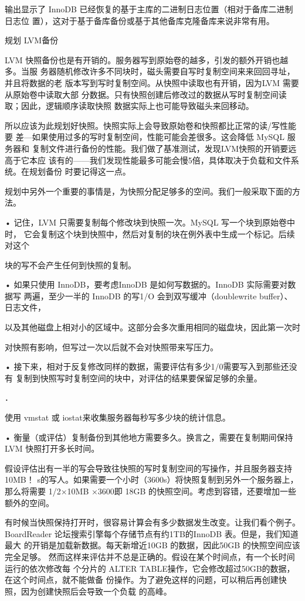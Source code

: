 输出显示了 InnoDB 已经恢复的基于主库的二进制日志位置（相对于备库二进制日志位
置），这对于基于备库备份或基于其他备库克隆备库来说非常有用。

规划 LVM备份

LVM 快照备份也是有开销的。服务器写到原始卷的越多，引发的额外开销也越多。当服
务器随机修改许多不同块时，磁头需要自写时复制空间来来回回寻址，并且将数据的老
版本写到写时复制空间。从快照中读取也有开销，因为LVM 需要从原始卷中读取大部
分数据。只有快照创建后修改过的数据从写时复制空间读取；因此，逻辑顺序读取快照
数据实际上也可能导致磁头来回移动。

所以应该为此规划好快照。快照实际上会导致原始卷和快照都比正常的读/写性能要
差—如果使用过多的写时复制空间，性能可能会差很多。这会降低 MySQL 服务器和
复制文件进行备份的性能。我们做了基准测试，发现LVM快照的开销要远高于它本应
该有的——我们发现性能最多可能会慢5倍，具体取决于负载和文件系统。在规划备份
时要记得这一点。

规划中另外一个重要的事情是，为快照分配足够多的空间。我们一般采取下面的方法。

• 记住，LVM 只需要复制每个修改块到快照一次。MySQL 写一个块到原始卷中时，
它会复制这个块到快照中，然后对复制的块在例外表中生成一个标记。后续对这个

块的写不会产生任何到快照的复制。

• 如果只使用 InnoDB，要考虑InnoDB 是如何写数据的。InnoDB 实际需要对数据写
两遍，至少一半的 InnoDB 的写1/O 会到双写缓冲（doublewrite buffer）、日志文件，

以及其他磁盘上相对小的区域中。这部分会多次重用相同的磁盘块，因此第一次时

对快照有影响，但写过一次以后就不会对快照带来写压力。

• 接下来，相对于反复修改同样的数据，需要评估有多少1/0需要写入到那些还没有
复制到快照写时复制空间的块中，对评估的结果要保留足够的余量。

．

使用 vmstat 或 iostat来收集服务器每秒写多少块的统计信息。

• 衡量（或评估）复制备份到其他地方需要多久。换言之，需要在复制期间保持LVM
快照打开多长时间。

假设评估出有一半的写会导致往快照的写时复制空间的写操作，并且服务器支持10MB！
s的写人。如果需要一个小时（3600s）将快照复制到另外一个服务器上，那么将需要
1/2×10MB ×3600即 18GB 的快照空间。考虑到容错，还要增加一些额外的空间。

有时候当快照保持打开时，很容易计算会有多少数据发生改变。让我们看个例子。
BoardReader 论坛搜索引擎每个存储节点有约1TB的InnoDB 表。但是，我们知道最大
的开销是加载新数据。每天新增近10GB 的数据，因此50GB 的快照空间应该完全足够。
然而这样来评估并不总是正确的。假设在某个时间点，有一个长时间运行的依次修改每
个分片的 ALTER TABLE操作，它会修改超过50GB的数据，在这个时间点，就不能做备
份操作。为了避免这样的问题，可以稍后再创建快照，因为创建快照后会导致一个负载
的高峰。

